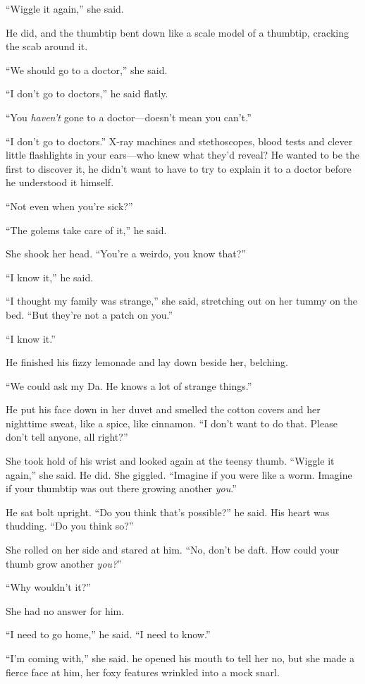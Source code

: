 \documentclass{article}
\begin{document}
``Wiggle it again,'' she said.

He did, and the thumbtip bent down like a scale model of a thumbtip,
cracking the scab around it.

``We should go to a doctor,'' she said.

``I don't go to doctors,'' he said flatly.

``You \textit{haven't} gone to a doctor---doesn't mean you can't.''

``I don't go to doctors.'' X-ray machines and stethoscopes, blood
tests and clever little flashlights in your ears---who knew what
they'd reveal?  He wanted to be the first to discover it, he didn't
want to have to try to explain it to a doctor before he understood it
himself.

``Not even when you're sick?''

``The golems take care of it,'' he said.

She shook her head.  ``You're a weirdo, you know that?''

``I know it,'' he said.

``I thought my family was strange,'' she said, stretching out on her
tummy on the bed.  ``But they're not a patch on you.''

``I know it.''

He finished his fizzy lemonade and lay down beside her, belching.

``We could ask my Da.  He knows a lot of strange things.''

He put his face down in her duvet and smelled the cotton covers and
her nighttime sweat, like a spice, like cinnamon.  ``I don't want to
do that.  Please don't tell anyone, all right?''

She took hold of his wrist and looked again at the teensy thumb. 
``Wiggle it again,'' she said.  He did.  She giggled.  ``Imagine if
you were like a worm.  Imagine if your thumbtip was out there growing
another \textit{you}.''

He sat bolt upright.  ``Do you think that's possible?'' he said.  His
heart was thudding.  ``Do you think so?''

She rolled on her side and stared at him.  ``No, don't be daft.  How
could your thumb grow another \textit{you?}''

``Why wouldn't it?''

She had no answer for him.

``I need to go home,'' he said.  ``I need to know.''

``I'm coming with,'' she said.  he opened his mouth to tell her no,
but she made a fierce face at him, her foxy features wrinkled into a
mock snarl.
\end{document}

